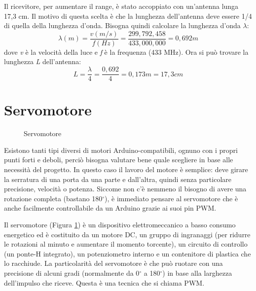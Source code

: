 \documentclass[12pt]{report}
\begin{document}
Il ricevitore, per aumentare il range, è stato accoppiato con un'antenna lunga 17,3 cm. Il motivo di questa scelta è che la lunghezza dell'antenna deve essere 1/4 di quella della lunghezza d'onda. Bisogna quindi calcolare la lunghezza d'onda $\lambda$:
%
\[\lambda(m) = \frac{v(m/s)}{f(Hz)} = \frac{299,792,458}{433,000,000} = 0,692 m\] 
%
dove \textit{v} è la velocità della luce e \textit{f} è la frequenza (433 MHz). Ora si può trovare la lunghezza \emph{L} dell'antenna: 
%
\[L = \frac{\lambda}{4} = \frac{0,692}{4} = 0,173m = 17,3 cm \]
%

%
\section{Servomotore}\label{sec:servomotore}
%

\begin{figure}[H]
	\caption{Servomotore}
	\label{fig:servo}
\end{figure}
Esistono tanti tipi diversi di motori Arduino-compatibili, ognuno con i propri punti forti e deboli, perciò bisogna valutare bene quale scegliere in base alle necessità del progetto. In questo caso il lavoro del motore è semplice: deve girare la serratura di una porta da una parte e dall'altra, quindi senza particolare precisione, velocità o potenza. Siccome non c'è nemmeno il bisogno di avere una rotazione completa (bastano 180$^{\circ}$), è immediato pensare al servomotore che è anche facilmente controllabile da un Arduino grazie ai suoi pin PWM.

Il servomotore (Figura \ref{fig:servo}) è un dispositivo elettromeccanico a basso consumo energetico ed è costituito da un motore DC, un gruppo di ingranaggi (per ridurre le rotazioni al minuto e aumentare il momento torcente), un circuito di controllo (un ponte-H integrato), un potenziometro interno e un contenitore di plastica che lo racchiude. La particolarità del servomotore è che può ruotare con una precisione di alcuni gradi (normalmente da 0$^{\circ}$ a 180$^{\circ}$) in base alla larghezza dell'impulso che riceve. Questa è una tecnica che si chiama PWM.
\end{document}
